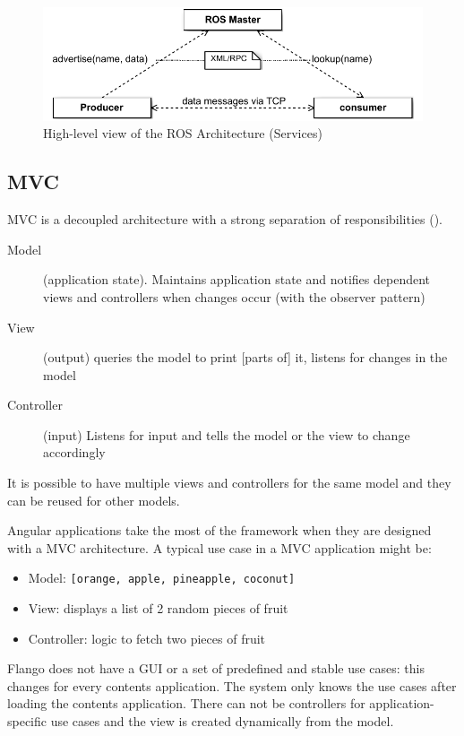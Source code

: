 \begin{figure}[htb]
    \centering
    \includegraphics{figures/design/ros-architecture-services.pdf}
    \caption{High-level view of the ROS Architecture (Services)}
    \label{fig:design-ros-services}
\end{figure}

\subsection{\acf{MVC}}
\acf{MVC} is a decoupled architecture with a strong separation of responsibilities ().
\begin{description}
    \item[Model] (application state). Maintains application state and notifies dependent views and controllers when changes occur (with the observer pattern)
    \item[View] (output) queries the model to print [parts of] it, listens for changes in the model
    \item[Controller] (input) Listens for input and tells the model or the view to change accordingly
\end{description}

It is possible to have multiple views and controllers for the same model and they can be reused for other models.

Angular applications take the most of the framework when they are designed with a \ac{MVC} architecture.
A typical use case in a \ac{MVC} application might be:
\begin{itemize}
    \item Model: \texttt{[orange, apple, pineapple, coconut]}
    \item View: displays a list of 2 random pieces of fruit
    \item Controller: logic to fetch two pieces of fruit
\end{itemize}

Flango \cm does not have a \ac{GUI} or a set of predefined and stable use cases: this changes for every contents application.
The system only knows the use cases after loading the contents application.
There can not be controllers for application-specific use cases and the view is created dynamically from the model.

